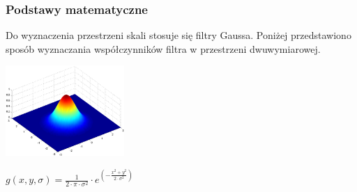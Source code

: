 \begin{frame}
\frametitle{Podstawy matematyczne}
Do wyznaczenia przestrzeni skali stosuje się filtry Gaussa. Poniżej przedstawiono sposób wyznaczania współczynników filtra w przestrzeni dwuwymiarowej.

\begin{center}
\includegraphics[width=4.5cm]{gaussian2d.png}

$ g(x,y,\sigma)= \frac{1}{2 \cdot \pi \cdot \sigma ^ {2} }\cdot e^{(-\frac{x^{2} + y^{2}}{2 \cdot \sigma ^{2}})} $
\end{center}
\end{frame}
